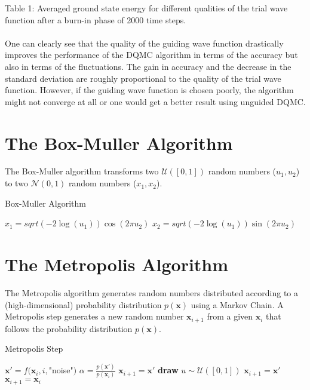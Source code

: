\documentclass [12pt]{report}
\begin{document}
Table 1: Averaged ground state energy for different qualities of the trial wave function after a burn-in phase of 2000 time steps.\\
\\
One can clearly see that the quality of the guiding wave function drastically improves the performance of the DQMC algorithm in terms of the accuracy but also in terms of the fluctuations. The gain in accuracy and the decrease in the standard deviation are roughly proportional to the quality of the trial wave function. However, if the guiding wave function is chosen poorly, the algorithm might not converge at all or one would get a better result using unguided DQMC.

\begin{appendices}
\chapter{The Box-Muller Algorithm} \label{appendixA}
The Box-Muller algorithm transforms two $\mathcal{U}([0,1])$ random numbers ($u_1, u_2$) to two $\mathcal{N}(0,1)$ random numbers ($x_1, x_2$).

\begin{algorithm}
\caption{Box-Muller Algorithm}\label{box-muller}
\begin{algorithmic}[1]
\State $x_1 = sqrt(-2\log(u_1))\cos(2\pi u_2)$
\State $x_2 = sqrt(-2\log(u_1))\sin(2\pi u_2)$
\EndProcedure
\end{algorithmic}
\end{algorithm}

\chapter{The Metropolis Algorithm} \label{appendixB}
The Metropolis algorithm generates random numbers distributed according to a (high-dimensional) probability distribution $p(\bm{x})$ using a Markov Chain. A Metropolis step generates a new random number $\bm{x}_{i+1}$ from a given $\bm{x}_i$ that follows the probability distribution $p(\bm{x})$.

\begin{algorithm}
\caption{Metropolis Step}\label{metropolis}
\begin{algorithmic}[1]
\State $\bm{x}' = f(\bm{x}_i,i,$"noise"$)$ 
\State $\alpha = \frac{p(\bm{x}')}{p(\bm{x}_i)}$
	\State $\bm{x}_{i+1} = \bm{x}'$ 
\Else
	\State \textbf{draw} $u \sim \mathcal{U}([0,1])$
		\State $\bm{x}_{i+1} = \bm{x}'$ 
	\Else
		\State $\bm{x}_{i+1} = \bm{x}_i$ 
	\EndIf
\EndIf 
\EndProcedure
\end{algorithmic}
\end{algorithm}


\end{appendices}
\end{document}
